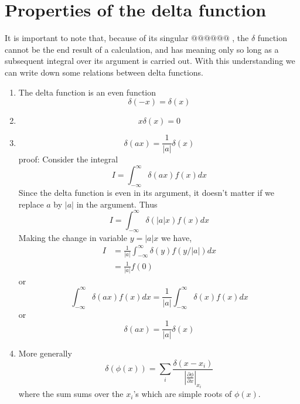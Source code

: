 	\section{Properties of the delta function}
		It is important to note that, because of its singular $@@@@@@$ , the $\delta$ function cannot be the end result of a calculation, and has meaning only so long as a subsequent integral over its argument is carried out. With this understanding we can write down some relations between delta functions.
		\begin{enumerate}[label=\textbf{Property \arabic*},start=1]
			\item 
			The delta function is an even function
			\begin{equation}
				\delta(-x) = \delta(x)
			\end{equation}
			
			\item
			\begin{equation}
				x \delta(x) = 0
			\end{equation}
			
			\item
			\begin{equation}
			\delta(a x) = \frac{1}{|a|} \delta(x)
			\end{equation}
			proof: Consider the integral
			\begin{equation}
				I = \int_{-\infty}^{\infty} \delta(a x) f(x) dx
			\end{equation}
			Since the delta function is even in its argument, it doesn't matter if we replace $a$ by $|a|$ in the argument. Thus
			\begin{equation}
				I = \int_{-\infty}^{\infty} \delta(|a| x) f(x) dx
			\end{equation}
			Making the change in variable $ y = |a| x$ we have,
			\begin{eqnarray}
				I &= \frac{1}{|a|}\int_{-\infty}^{\infty} \delta(y) f(y/|a|) dx \nonumber \\
				&= \frac{1}{|a|} f(0) \nonumber
			\end{eqnarray}			
			or
			\begin{equation}
				\int_{-\infty}^{\infty} \delta(a x) f(x) dx = \frac{1}{|a|} \int_{-\infty}^{\infty} \delta(x) f(x) dx
			\end{equation}
			or
			\begin{equation}
				\delta(a x) = \frac{1}{|a|} \delta(x)
			\end{equation}
			
			
			\item
			More generally
			\begin{equation}
				\delta(\phi(x)) = \sum_{i} \frac{\delta(x - x_i)}{\left|\frac{\partial\phi}{\partial x}\right|_{x_i}}
			\end{equation}
			where the sum sums over the $x_i$'s which are simple roots of $\phi(x)$.
			

\end{enumerate}
